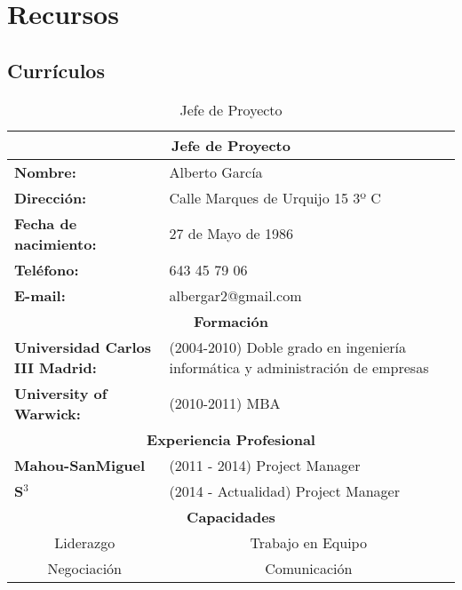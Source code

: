 \section{Recursos}
\subsection{Currículos}

\begin{table}[H]
\begin{center}
\begin{tabular}{p{} p{9cm}}
\multicolumn{2}{c}{\Large{\textbf{Jefe de Proyecto}}} \\
\hline
\textbf{Nombre:} & Alberto García\\
\textbf{Dirección:} & Calle Marques de Urquijo 15 3º C\\
\textbf{Fecha de nacimiento:} & 27 de Mayo de 1986 \\
\textbf{Teléfono:} & 643 45 79 06\\
\textbf{E-mail:} & albergar2@gmail.com\\
\hline \hline
\multicolumn{2}{c}{\textbf{Formación} } \\
\hline
\textbf{Universidad Carlos III Madrid:} & (2004-2010) Doble grado en ingeniería informática y administración de empresas  \\
\textbf{University of Warwick:} & (2010-2011) MBA  \\
\hline \hline
\multicolumn{2}{c}{\textbf{Experiencia Profesional} } \\
\hline
\textbf{Mahou-SanMiguel} & (2011 - 2014) Project Manager\\
\textbf{S$^3$} & (2014 - Actualidad) Project Manager\\
\hline \hline
\multicolumn{2}{c}{\textbf{Capacidades} } \\
\hline
\multicolumn{1}{c}{Liderazgo} & \multicolumn{1}{c}{Trabajo en Equipo}\\ 
\multicolumn{1}{c}{Negociación} & \multicolumn{1}{c}{Comunicación} \\
\hline \hline
\end{tabular}
\caption{Jefe de Proyecto}
\label{tab:jefeDeProyecto}
\end{center}
\end{table}



